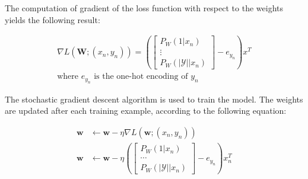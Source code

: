 \documentclass[12pt]{article}
\begin{document}
\begin{enumerate}[leftmargin=\labelsep]
\begin{enumerate}[label=\alph*)]
                    \vspace{12pt}

                    The computation of gradient of the loss function with respect to the weights yields the following result:

                    \begin{equation}
                        \begin{gathered}
                            \nabla L(\mathbf{W}; (x_n, y_n)) = \left(\begin{bmatrix}
                                P_W(1 | x_n) \\
                                \vdots       \\
                                P_W(|\mathcal{Y}| | x_n)
                            \end{bmatrix} - e_{y_n} \right) x^T \\
                            \text{where } e_{y_n} \text{ is the one-hot encoding of } y_n
                        \end{gathered}
                    \end{equation}

                    \vspace{12pt}
                    The stochastic gradient descent algorithm is used to train the model. The weights are updated after each training example, according to the following equation:

                    \begin{equation}
                        \begin{aligned}
                            \mathbf{w} & \leftarrow \mathbf{w} - \eta \nabla L(\mathbf{w}; (x_n, y_n))            \\
                            \mathbf{w} & \leftarrow \mathbf{w} - \eta \left(\begin{bmatrix}
                                                                                P_W(1 | x_n) \\
                                                                                \cdots       \\
                                                                                P_W(|\mathcal{Y}| | x_n)
                                                                            \end{bmatrix} - e_{y_n} \right) x_n^T
                        \end{aligned}
                    \end{equation}


\end{enumerate}
\end{enumerate}
\end{document}

